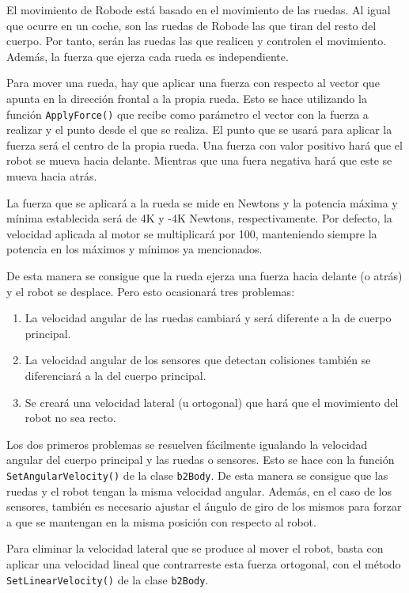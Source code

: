El movimiento de Robode está basado en el movimiento de las ruedas. Al igual que ocurre en un coche, son las ruedas de Robode las que tiran del resto del cuerpo. Por tanto, serán las ruedas las que realicen y controlen el movimiento. Además, la fuerza que ejerza cada rueda es independiente. 

Para mover una rueda, hay que aplicar una fuerza con respecto al vector que apunta en la dirección frontal a la propia rueda. Esto se hace utilizando la función \texttt{ApplyForce()} que recibe como parámetro el vector con la fuerza a realizar y el punto desde el que se realiza. El punto que se usará para aplicar la fuerza será el centro de la propia rueda. Una fuerza con valor positivo hará que el robot se mueva hacia delante. Mientras que una fuera negativa hará que este se mueva hacia atrás.

La fuerza que se aplicará a la rueda se mide en Newtons y la potencia máxima y mínima establecida será de 4K y -4K Newtons, respectivamente. Por defecto, la velocidad aplicada al motor se multiplicará por 100, manteniendo siempre la potencia en los máximos y mínimos ya mencionados.

De esta manera se consigue que la rueda ejerza una fuerza hacia delante (o atrás) y el robot se desplace. Pero esto ocasionará tres problemas: 

\begin{enumerate}
	\item La velocidad angular de las ruedas cambiará y será diferente a la de cuerpo principal.
	\item La velocidad angular de los sensores que detectan colisiones también se diferenciará a la del cuerpo principal.
	\item Se creará una velocidad lateral (u ortogonal) que hará que el movimiento del robot no sea recto.
\end{enumerate} 

Los dos primeros problemas se resuelven fácilmente igualando la velocidad angular del cuerpo principal y las ruedas o sensores. Esto se hace con la función \texttt{SetAngularVelocity()} de la clase \texttt{b2Body}. De esta manera se consigue que las ruedas y el robot tengan la misma velocidad angular. Además, en el caso de los sensores, también es necesario ajustar el ángulo de giro de los mismos para forzar a que se mantengan en la misma posición con respecto al robot.

Para eliminar la velocidad lateral que se produce al mover el robot, basta con aplicar una velocidad lineal que contrarreste esta fuerza ortogonal, con el método \texttt{SetLinearVelocity()}  de la clase \texttt{b2Body}. 


